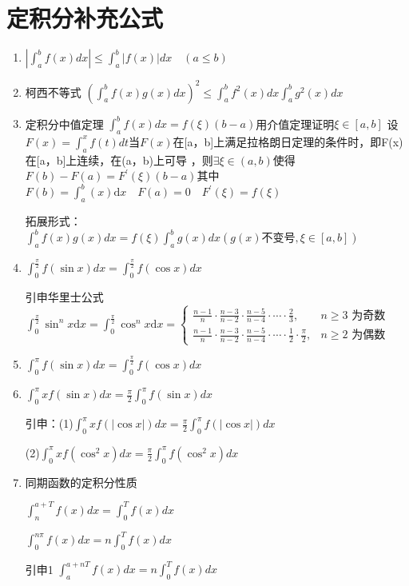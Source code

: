 \documentclass[a4paper,11pt]{book}
\begin{document}
\section*{定积分补充公式}

\begin{enumerate}
    \item $\displaystyle{\left|\int_{a}^{b} f(x) d x\right| \le \int_{a}^{b} | f(x) | d x \quad(a \leq b)}$
    \item 柯西不等式 $\displaystyle{\left(\int_{a}^{b} f(x) g(x) d x\right)^{2} \le \int_{a}^{b} f^{2}(x) d x \int_{a}^{b} g^{2}(x) d x}$
    \item 定积分中值定理 $\displaystyle{\int_{a}^{b} f(x) d x=f(\xi)(b-a)}$用介值定理证明$\xi \in [a,b]$
    设$\displaystyle{F(x)=\int_{a}^{x} f(t) d t}$当$F(x)$在[a，b]上满足拉格朗日定理的条件时，即F(x)在[a，b]上连续，在(a，b)上可导
    ，则$\exists \xi \in (a,b)$使得$F(b)-F(a)=F^{\prime}(\xi)(b-a)$其中$F(b)=\int _{a}^{b} (x)\mathrm{d}x\quad F(a)=0 \quad F^{\prime}(\xi)=f(\xi)$

    拓展形式：$\int_{a}^{b} f(x) g(x) d x=f(\xi) \int_{a}^{b} g(x) d x(g(x)\text{不变号},\xi \in [a,b])$
    \item $\displaystyle{\int_{0}^{\frac{\pi}{2}} f(\sin x) d x=\int_{0}^{\frac{\pi}{2}} f(\cos x) d x}$
    
    引申华里士公式$\displaystyle{\int_{0}^{\frac{\pi}{2}} \sin ^{n} x \mathrm{d} x=\int_{0}^{\frac{\pi}{2}} \cos ^{n} x \mathrm{d} x=\left\{\begin{array}{ll}
        \frac{n-1}{n} \cdot \frac{n-3}{n-2} \cdot \frac{n-5}{n-4} \cdot \cdots \cdot \frac{2}{3}, & n \ge 3 \text { 为奇数 } \\
        \frac{n-1}{n} \cdot \frac{n-3}{n-2} \cdot \frac{n-5}{n-4} \cdot \cdots \cdot \frac{1}{2} \cdot \frac{\pi}{2}, & n \ge 2 \text { 为偶数 }
        \end{array}\right.}$
    \item $\displaystyle{\int_{0}^{\pi} f(\sin x) d x=\int_{0}^{\frac{\pi}{2}} f(\cos x) d x}$
    \item $\displaystyle{\int_{0}^{\pi} x f(\sin x) d x}=\frac{\pi}{2} \int_{0}^{\pi} f(\sin x) d x$
    
    引申：(1)$\displaystyle{\int_{0}^{\pi} x f(|\cos x|) d x=\frac{\pi}{2} \int_{0}^{\pi} f(|\cos x|) d x}$

    \qquad \quad (2)$\displaystyle{\int_{0}^{\pi} x f\left(\cos ^{2} x\right) d x=\frac{\pi}{2} \int_{0}^{\pi} f\left(\cos ^{2} x\right) d x}$


    \item 同期函数的定积分性质
    
    \vspace{2ex}
    
    \quad \qquad $\displaystyle{\int_{n}^{a+T} f(x) d x=\int_{0}^{T} f(x) d x}$

    \quad \qquad $\displaystyle{\int_{0}^{n \pi} f(x) d x=n \int_{0}^{T} f(x) d x}$

    \quad \qquad 引申1 $\displaystyle{\int_{a}^{a+n T} f(x) d x=n \int_{0}^{T} f(x) d x}$

\end{enumerate}
\end{document}
